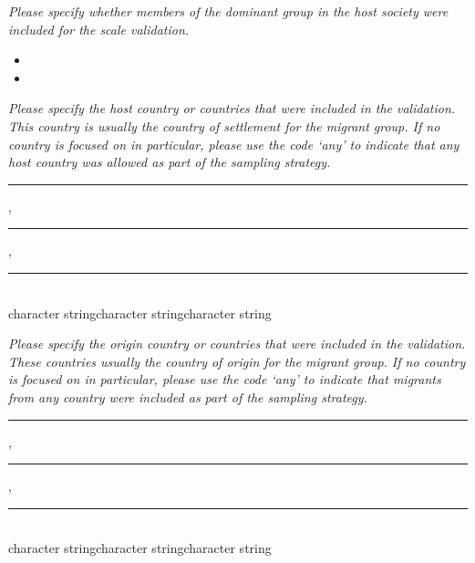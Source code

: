 \documentclass[10pt,a4paper]{protocol}
\newlength{\rulewidth}
\newlength{\ruleandnamegap}
\newcommand{\namefont}{\tiny}
\begin{document}
\textit{Please specify whether members of the dominant group in the host society were included for the scale validation.}
\vspace{0.5em}
\begin{itemize}
	\item {}
    \item {}
\end{itemize}
\divider

\textit{Please specify the host country or countries that were included in the validation. This country is usually the country of settlement for the migrant group. If no country is focused on in particular, please use the code `any' to indicate that any host country was allowed as part of the sampling strategy.}
\vspace{1.5em}

\rule{3cm}{} , \rule{3cm}{} , \rule{3cm}{}\\
\vspace{\dimexpr-\baselineskip+\ruleandnamegap}
{\namefont character string\hspace{2.08cm}character string\hspace{2.08cm}character string}\par
\divider

\textit{Please specify the origin country or countries that were included in the validation. These countries usually the country of origin for the migrant group. If no country is focused on in particular, please use the code `any' to indicate that migrants from any country were included as part of the sampling strategy.}
\vspace{1.5em}

\rule{3cm}{} , \rule{3cm}{} , \rule{3cm}{}\\
\vspace{\dimexpr-\baselineskip+\ruleandnamegap}
{\namefont character string\hspace{2.08cm}character string\hspace{2.08cm}character string}\par
\divider

\clearpage
\vspace*{2em}
\end{document}
